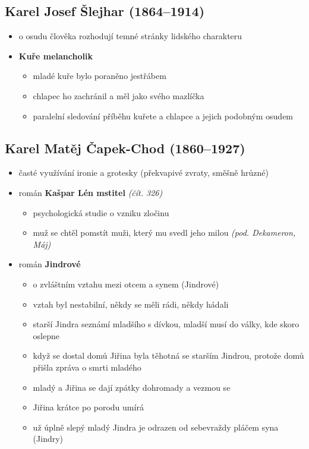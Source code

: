 \subsection{Karel Josef Šlejhar (1864--1914)}
\begin{itemize}
\item o osudu člověka rozhodují temné stránky lidského charakteru
\item \textbf{Kuře melancholik}
	\begin{itemize}
	\item mladé kuře bylo poraněno jestřábem
	\item chlapec ho zachránil a měl jako svého mazlíčka
	\item paralelní sledování příběhu kuřete a chlapce a jejich podobným osudem
	\end{itemize}
\end{itemize}

\subsection{Karel Matěj Čapek-Chod (1860--1927)}
\begin{itemize}
\item časté využívání ironie a grotesky (překvapivé zvraty, směšně hrůzné)
\item román \textbf{Kašpar Lén mstitel} \textit{(čít. 326)}
	\begin{itemize}
	\item psychologická studie o vzniku zločinu
	\item muž se chtěl pomstít muži, který mu svedl jeho milou \textit{(pod. Dekameron, Máj)}
	\end{itemize}

\item román \textbf{Jindrové}
	\begin{itemize}
	\item o zvláštním vztahu mezi otcem a synem (Jindrové)
	\item vztah byl nestabilní, někdy se měli rádi, někdy hádali
	\item starší Jindra seznámí mladšího s dívkou, mladší musí do války, kde skoro oslepne
	\item když se dostal domů Jiřina byla těhotná se starším Jindrou, protože domů přišla zpráva o smrti mladého 
	\item mladý a Jiřina se dají zpátky dohromady a vezmou se
	\item Jiřina krátce po porodu umírá
	\item už úplně slepý mladý Jindra je odrazen od sebevraždy pláčem syna (Jindry)
	\end{itemize}
\end{itemize}


